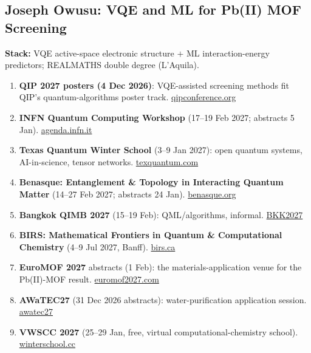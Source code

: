 \documentclass[11pt,a4paper]{article}
\begin{document}
\subsection{Joseph Owusu: VQE and ML for Pb(II) MOF Screening}
\textbf{Stack:} VQE active-space electronic structure $+$ ML interaction-energy predictors; REALMATHS double degree (L'Aquila).
\begin{enumerate}[leftmargin=1.6em]
  \item \textbf{QIP 2027 posters (4 Dec 2026)}: VQE-assisted screening methods fit QIP's quantum-algorithms poster track. \href{https://qipconference.org/2027/call/}{qipconference.org}
  \item \textbf{INFN Quantum Computing Workshop} (17--19 Feb 2027; abstracts 5 Jan). \href{https://agenda.infn.it/event/53380/abstracts/}{agenda.infn.it}
  \item \textbf{Texas Quantum Winter School} (3--9 Jan 2027): open quantum systems, AI-in-science, tensor networks. \href{https://www.texquantum.com/index.html}{texquantum.com}
  \item \textbf{Benasque: Entanglement \& Topology in Interacting Quantum Matter} (14--27 Feb 2027; abstracts 24 Jan). \href{https://www.benasque.org/2027etqm/}{benasque.org}
  \item \textbf{Bangkok QIMB 2027} (15--19 Feb): QML/algorithms, informal. \href{https://www.thaihep.phys.sc.chula.ac.th/BKK2027QIMB/}{BKK2027}
  \item \textbf{BIRS: Mathematical Frontiers in Quantum \& Computational Chemistry} (4--9 Jul 2027, Banff). \href{https://www.birs.ca/events/2027/5-day-workshops/27w5742}{birs.ca}
  \item \textbf{EuroMOF 2027} abstracts (1 Feb): the materials-application venue for the Pb(II)-MOF result. \href{https://euromof2027.com/}{euromof2027.com}
  \item \textbf{AWaTEC27} (31 Dec 2026 abstracts): water-purification application session. \href{https://awatec27.dista.uninsubria.it/}{awatec27}
  \item \textbf{VWSCC 2027} (25--29 Jan, free, virtual computational-chemistry school). \href{https://winterschool.cc/}{winterschool.cc}
\end{enumerate}
\end{document}
